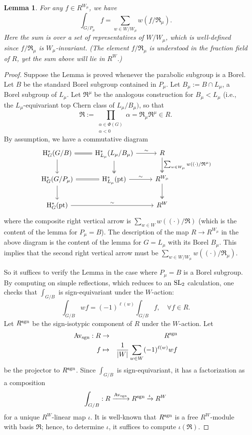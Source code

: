 \documentclass[reqno]{amsart}
\numberwithin{equation}{subsection}
\newtheorem{lemma}[subsubsection]{Lemma}
\theoremstyle{definition}
\newcommand\frR{\mathfrak{R}}
\newcommand\Av{\textup{Av}}
\newcommand\pt{\textup{pt}}
\newcommand\sgn{\textup{sgn}}
\newcommand\SL{\textup{SL}}
\newcommand\xr{\xrightarrow}
\renewcommand\a\alpha
\newcommand{\io}{\iota}
\newcommand{\rH}{\ensuremath{\mathrm{H}}\xspace}
\begin{document}
\begin{lemma}\label{lem:w-average-integration}For any $f\in R^{W_{\mu}}$, we have
\begin{equation}\label{Av w f/R}
\int_{G/P_{\mu}}f=\sum_{w\in W/W_{\mu}}w(f/\frR_{\mu}).
\end{equation}
Here the sum is over a set of representatives of $W/W_{\mu}$, which is well-defined since $f/\frR_{\mu}$ is $W_{\mu}$-invariant. (The element $f/\frR_{\mu}$ is understood in the fraction field of $R$, yet the sum above will lie in $R^{W}$.)
\end{lemma}
\begin{proof}
Suppose the Lemma is proved whenever the parabolic subgroup is a Borel. Let $B$ be the standard Borel subgroup contained in $P_\mu$. Let $B_\mu := B \cap L_\mu$, a Borel subgroup of $L_\mu$. Let $\frR^\mu$ be the analogous construction for $B_\mu < L_\mu$ (i.e., the $L_\mu$-equivariant top Chern class of $L_\mu/B_\mu)$, so that 
\[
\frR :=\prod_{\substack{\alpha \in \Phi(G) \\ \a < 0 }} \a  =  \frR_\mu \frR^\mu \in R.
\]
By assumption, we have a commutative diagram
\[
\begin{tikzcd}
\rH_G^*(G/B) \ar[d] \ar[r, equals] & \rH_{L_\mu}^*(L_\mu/B_\mu) \ar[d, twoheadrightarrow] \ar[r,"\sim"] & R \ar[d, twoheadrightarrow, "\sum_{w \in W_\mu} w((\cdot) /\frR^\mu)"] \\
\rH_G^*(G/P_\mu) \ar[d] \ar[r, equals] &  \rH_{L_\mu}^*(\pt) \ar[r, "\sim"] & R^{W_\mu} \ar[d, twoheadrightarrow]  \\
\rH_G^*(\pt) \ar[rr, "\sim"] & & R^W
\end{tikzcd}
\]
where the composite right vertical arrow is $\sum_{w \in W} w((\cdot)/\frR)$ (which is the content of the lemma for $P_{\mu}=B$). The description of the map $R\to R^{W_{\mu}}$ in the above diagram is the content of the lemma for $G=L_{\mu}$ with its Borel $B_{\mu}$. This implies that the second right vertical arrow must be $\sum_{w \in W/W_\mu} w((\cdot)/\frR_\mu)$. 


So it suffices to verify the Lemma in the case where $P_\mu = B$ is a Borel subgroup. By computing on simple reflections, which reduces to an $\SL_{2}$ calculation, one checks that $\int_{G/B}$ is sign-equivariant under the $W$-action:
\begin{equation*}
\int_{G/B}wf=(-1)^{\ell(w)}\int_{G/B}f, \quad \forall f\in R.
\end{equation*}
Let $R^{\sgn}$ be the sign-isotypic component of $R$ under the $W$-action. Let
\begin{eqnarray*}
\Av_{\sgn}: R&\to& R^{\sgn}\\
f &\mapsto& \frac{1}{|W|}\sum_{w\in W}(-1)^{\ell(w)}wf
\end{eqnarray*}
be the projector to $R^{\sgn}$. Since $\int_{G/B}$ is sign-equivariant, it has a factorization as a composition
\begin{equation*}
\int_{G/B}: R\xr{\Av_{\sgn}}R^{\sgn}\xr{\io}R^{W}
\end{equation*}
for a unique $R^{W}$-linear map $\io$. It is well-known that $R^{\sgn}$ is a free $R^{W}$-module with basis $\frR$; hence, to determine $\io$, it suffices to compute $\io(\frR)$. 


\end{proof}
\end{document}
